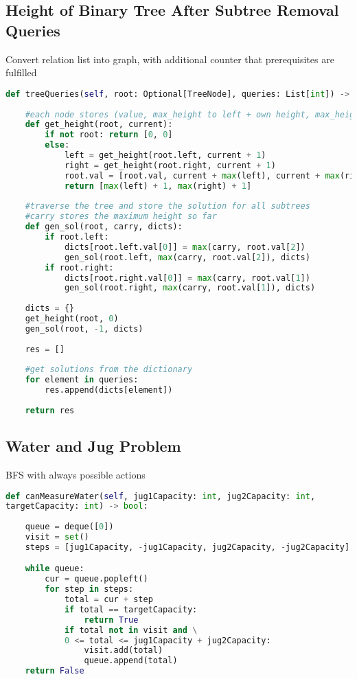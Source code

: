 \documentclass[english, threecolumn]{latex4ei/latex4ei_sheet}
\begin{document}
\begin{sectionbox}
\subsection{Height of Binary Tree After Subtree Removal Queries}
Convert relation list into graph, with additional counter that prerequisites are fulfilled

\begin{lstlisting}[language=python, gobble=0]
def treeQueries(self, root: Optional[TreeNode], queries: List[int]) -> List[int]:
        
    #each node stores (value, max_height to left + own height, max_height to right + own height)
    def get_height(root, current):
        if not root: return [0, 0]
        else:
            left = get_height(root.left, current + 1)
            right = get_height(root.right, current + 1)
            root.val = [root.val, current + max(left), current + max(right)]
            return [max(left) + 1, max(right) + 1]
       
    #traverse the tree and store the solution for all subtrees
    #carry stores the maximum height so far
    def gen_sol(root, carry, dicts):
        if root.left:
            dicts[root.left.val[0]] = max(carry, root.val[2])
            gen_sol(root.left, max(carry, root.val[2]), dicts)
        if root.right:
            dicts[root.right.val[0]] = max(carry, root.val[1])
            gen_sol(root.right, max(carry, root.val[1]), dicts)
            
    dicts = {}
    get_height(root, 0)
    gen_sol(root, -1, dicts)
    
    res = []
    
    #get solutions from the dictionary
    for element in queries:
        res.append(dicts[element])
    
    return res
\end{lstlisting}
\end{sectionbox}

\begin{sectionbox}
\subsection{Water and Jug Problem}
BFS with always possible actions

\begin{lstlisting}[language=python, gobble=0]
def canMeasureWater(self, jug1Capacity: int, jug2Capacity: int, 
targetCapacity: int) -> bool:
        
    queue = deque([0])
    visit = set()
    steps = [jug1Capacity, -jug1Capacity, jug2Capacity, -jug2Capacity]

    while queue:
        cur = queue.popleft()
        for step in steps:
            total = cur + step
            if total == targetCapacity:
                return True
            if total not in visit and \
            0 <= total <= jug1Capacity + jug2Capacity:
                visit.add(total)
                queue.append(total)
    return False
\end{lstlisting}
\end{sectionbox}




\end{document}
